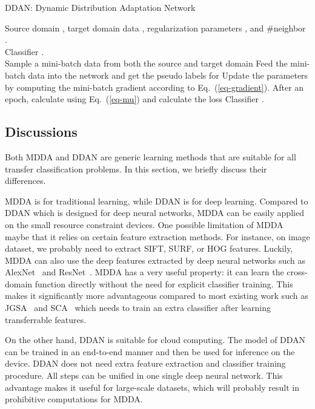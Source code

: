 \documentclass[acmsmall]{acmart}
\begin{document}
\begin{algorithm}[t!] 
	\caption{DDAN: Dynamic Distribution Adaptation Network}  
	\label{algo-DDAN}  
	\renewcommand{\algorithmicrequire}{\textbf{Input:}} 
	\renewcommand{\algorithmicensure}{\textbf{Output:}}
	\begin{algorithmic}[1]  
		\REQUIRE 
		Source domain , target domain data , regularization parameters , and \#neighbor .\\
		\ENSURE 
		Classifier .\\
		\REPEAT
		\STATE Sample a mini-batch data from both the source and target domain
		\STATE Feed the mini-batch data into the network and get the pseudo labels for 
		\STATE Update the parameters  by computing the mini-batch gradient according to Eq.~(\ref{eq-gradient}).
		\STATE After an epoch, calculate  using Eq.~(\ref{eq-mu}) and calculate the loss
		\RETURN Classifier .  
	\end{algorithmic}  
\end{algorithm}


\subsection{Discussions}

Both MDDA and DDAN are generic learning methods that are suitable for all transfer classification problems. In this section, we briefly discuss their differences.

MDDA is for traditional learning, while DDAN is for deep learning. Compared to DDAN which is designed for deep neural networks, MDDA can be easily applied on the small resource constraint devices. One possible limitation of MDDA maybe that it relies on certain feature extraction methods. For instance, on image dataset, we probably need to extract SIFT, SURF, or HOG features. Luckily, MDDA can also use the deep features extracted by deep neural networks such as AlexNet~\cite{krizhevsky2012imagenet} and ResNet~\cite{he2016deep}. MDDA has a very useful property: it can learn the cross-domain function directly without the need for explicit classifier training. This makes it significantly more advantageous compared to most existing work such as JGSA~\cite{zhang2017joint} and SCA~\cite{ghifary2017scatter} which needs to train an extra classifier after learning transferrable features.

On the other hand, DDAN is suitable for cloud computing. The model of DDAN can be trained in an end-to-end manner and then be used for inference on the device. DDAN does not need extra feature extraction and classifier training procedure. All steps can be unified in one single deep neural network. This advantage makes it useful for large-scale datasets, which will probably result in prohibitive computations for MDDA.
\end{document}
